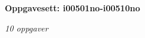\centerline{\bf Oppgavesett: i00501no-i00510no}
\vskip 10pt
\centerline{\it 10 oppgaver}\vskip 10pt
\vskip 10pt
